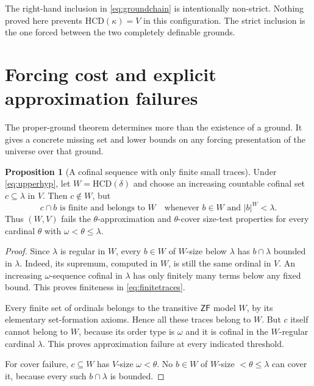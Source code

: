 \documentclass[11pt,letterpaper]{article}
\theoremstyle{definition}
\newtheorem{proposition}[definition]{Proposition}
\newcommand{\ZF}{\mathsf{ZF}}
\newcommand{\HCD}{\mathrm{HCD}}
\begin{document}
The right-hand inclusion in \eqref{eq:groundchain} is intentionally non-strict. Nothing proved here prevents $\HCD(\kappa)=V$ in this configuration. The strict inclusion is the one forced between the two completely definable grounds.

\section{Forcing cost and explicit approximation failures}\label{sec:cost}

The proper-ground theorem determines more than the existence of a ground. It gives a concrete missing set and lower bounds on any forcing presentation of the universe over that ground.

\begin{proposition}[A cofinal sequence with only finite small traces]\label{prop:approxfail}
Under \eqref{eq:upperhyp}, let $W=\HCD(\delta)$ and choose an increasing countable cofinal set $c\subseteq\lambda$ in $V$. Then $c\notin W$, but
\begin{equation}\label{eq:finitetraces}
    c\cap b\text{ is finite and belongs to }W
    \quad\text{whenever }b\in W\text{ and }|b|^W<\lambda.
\end{equation}
Thus $(W,V)$ fails the $\theta$-approximation and $\theta$-cover size-test properties for every cardinal $\theta$ with $\omega<\theta\leq\lambda$.
\end{proposition}

\begin{proof}
Since $\lambda$ is regular in $W$, every $b\in W$ of $W$-size below $\lambda$ has $b\cap\lambda$ bounded in $\lambda$. Indeed, its supremum, computed in $W$, is still the same ordinal in $V$. An increasing $\omega$-sequence cofinal in $\lambda$ has only finitely many terms below any fixed bound. This proves finiteness in \eqref{eq:finitetraces}.

Every finite set of ordinals belongs to the transitive $\ZF$ model $W$, by its elementary set-formation axioms. Hence all these traces belong to $W$. But $c$ itself cannot belong to $W$, because its order type is $\omega$ and it is cofinal in the $W$-regular cardinal $\lambda$. This proves approximation failure at every indicated threshold.

For cover failure, $c\subseteq W$ has $V$-size $\omega<\theta$. No $b\in W$ of $W$-size $<\theta\leq\lambda$ can cover it, because every such $b\cap\lambda$ is bounded.
\end{proof}
\end{document}
